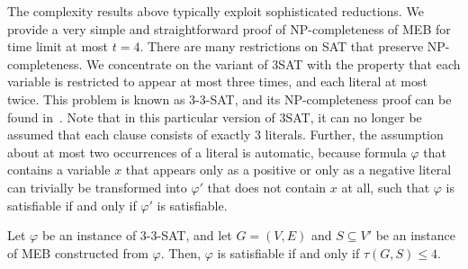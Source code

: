 The complexity results above typically exploit sophisticated reductions.
We provide a very simple and straightforward proof of NP-completeness of MEB for time limit at most $t=4$.
There are many restrictions on SAT that preserve NP-completeness.
We concentrate on the variant of 3SAT with the property that each variable is restricted to appear at most three times, and each literal at most twice. 
This problem is known as 3-3-SAT, and its NP-completeness proof can be found in~\cite{papadimitriou94}. 
Note that in this particular version of 3SAT, it can no longer be assumed that each clause consists of exactly 3 literals.
Further, the assumption about at most two occurrences of a literal is automatic, 
because formula $\varphi$ that contains a variable $x$ that appears only as a positive or only as a negative literal can trivially be transformed into $\varphi'$ that does not contain $x$ at all, 
such that $\varphi$ is satisfiable if and only if $\varphi'$ is satisfiable.
\begin{lemma}
Let $\varphi$ be an instance of \textsc{3-3-SAT}, and let $G=(V,E)$ and $S\subseteq V'$ be an instance of MEB constructed from $\varphi$. 
Then, $\varphi$ is satisfiable if and only if $\tau(G,S)\leq 4$.
\end{lemma}
